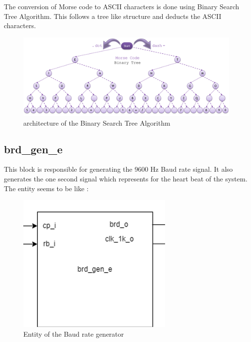 \documentclass[12pt,a4paper]{article}
\begin{document}
The conversion of Morse code to ASCII characters is done using Binary Search Tree Algorithm. This follows a tree like structure and deducts the ASCII characters. \\

\begin{figure}[H]
\centering
\includegraphics[scale=0.5]{bst.png}
\caption{architecture of the Binary Search Tree Algorithm}
\label{architecture of the Binary Search Tree Algorithm}
\end{figure}


\subsection{brd\_gen\_e}
This block is responsible for generating the 9600 Hz Baud rate signal. It also generates the one second signal which represents for the heart beat of the system.\\ 

The entity seems to be like :\\
\begin{figure}[H]
\centering
\includegraphics[scale=1.0]{brd_gen_e.PNG}
\caption{Entity of the Baud rate generator}
\label{Entity of the Baud Rate Generator}
\end{figure}
\end{document}
